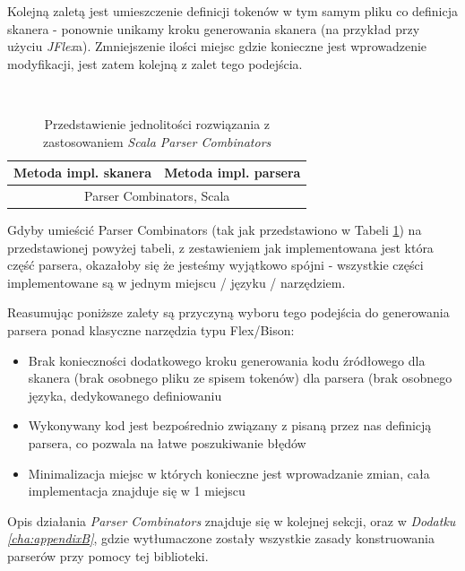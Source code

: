 \documentclass[pdflatex,11pt]{aghdpl}
\begin{document}
Kolejną zaletą jest umieszczenie definicji tokenów w tym samym pliku co definicja skanera - ponownie unikamy kroku generowania 
skanera (na przykład przy użyciu \textit{JFlex}a). Zmniejszenie ilości miejsc gdzie konieczne jest wprowadzenie modyfikacji, jest zatem kolejną z zalet
tego podejścia.

~\\\*

\begin{table}[ch]
  \begin{center}
    \begin{tabular}{| l | l |}
      \hline
      Metoda impl. skanera & Metoda impl. parsera\\
      \hline
      \multicolumn{2}{|c|}{Parser Combinators, Scala} \\
      \hline
    \end{tabular}
    \caption{Przedstawienie jednolitości rozwiązania z zastosowaniem \textit{Scala Parser Combinators}}
  \end{center}
  \label{tab:scala_parsers_table}
\end{table}

Gdyby umieścić Parser Combinators (tak jak przedstawiono w Tabeli \ref{tab:scala_parsers_table}) na przedstawionej powyżej tabeli, z zestawieniem jak implementowana jest która część parsera,
okazałoby się że jesteśmy wyjątkowo spójni - wszystkie części implementowane są w jednym miejscu / języku / narzędziem.

Reasumując poniższe zalety są przyczyną wyboru tego podejścia do generowania parsera ponad klasyczne narzędzia typu Flex/Bison:
\begin{itemize}
 \item Brak konieczności dodatkowego kroku generowania kodu źródłowego
  \subitem dla skanera (brak osobnego pliku ze spisem tokenów)
  \subitem dla parsera (brak osobnego języka, dedykowanego definiowaniu
 \item Wykonywany kod jest bezpośrednio związany z pisaną przez nas definicją parsera, co pozwala na łatwe poszukiwanie błędów
 \item Minimalizacja miejsc w których konieczne jest wprowadzanie zmian, cała implementacja znajduje się w 1 miejscu
\end{itemize}

Opis działania \textit{Parser Combinators} znajduje się w kolejnej sekcji, oraz w \textit{Dodatku \ref{cha:appendixB}}, gdzie wytłumaczone zostały wszystkie zasady
konstruowania parserów przy pomocy tej biblioteki.
\end{document}
